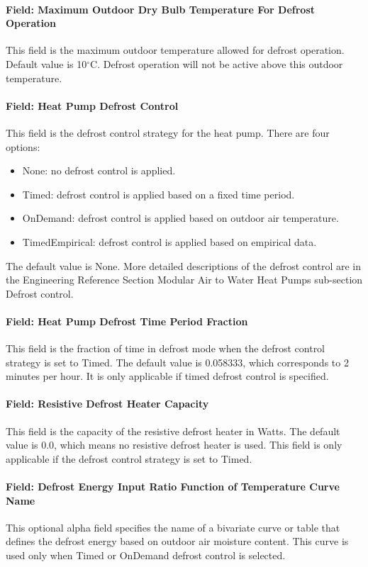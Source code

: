 \paragraph{Field: Maximum Outdoor Dry Bulb Temperature For Defrost Operation}
This field is the maximum outdoor temperature allowed for defrost operation.
Default value is 10$^\circ$C. Defrost operation will not be active above this
outdoor temperature.
\paragraph{Field: Heat Pump Defrost Control} This field is the defrost control
strategy for the heat pump. There are four options:
\begin{itemize} %
    \item None: no defrost control is applied.
    \item Timed: defrost control is applied based on a fixed time period.
    \item OnDemand: defrost control is applied based on outdoor air temperature.
    \item TimedEmpirical: defrost control is applied based on empirical data.
\end{itemize} The default value is None.
More detailed descriptions of the defrost control are in the Engineering Reference
Section Modular Air to Water Heat Pumps sub-section Defrost control.
\paragraph{Field: Heat Pump Defrost Time Period Fraction} This field is the
fraction of time in defrost mode when the defrost control strategy is set to
Timed. The default value is 0.058333, which corresponds to 2 minutes per hour.
It is only applicable if timed defrost control is specified.
\paragraph{Field: Resistive Defrost Heater Capacity} This field is the capacity
of the resistive defrost heater in Watts. The default value is 0.0, which means
no resistive defrost heater is used. This field is only applicable if the
defrost control strategy is set to Timed.
\paragraph{Field: Defrost Energy Input Ratio Function of Temperature Curve Name}
This optional alpha field specifies the name of a bivariate curve or table that
defines the defrost energy based on outdoor air moisture content. This curve is
used only when Timed or OnDemand defrost control is selected.
